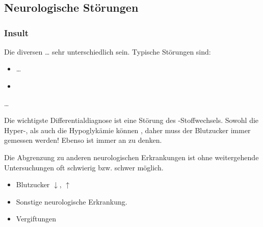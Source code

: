 \documentclass[
ngerman,
paper=a4,
asymmetric,
fontsize=10pt,
headings=small,
draft=false,
openany,
numbers=noenddot,
bibtotocnumbered,
footnotes=multiple,
toc=flat,
]{scrreprt}
\begin{document}
\chapter{{\AASS} \VarAassVersion}

\section{\CC{[NEU]} Neurologische Störungen}

\subsection{Insult}

\TextSlide{\TxSymptome}
{%
\label{topic:hirndruckzeichen}
Die diversen  {\ldots} 
sehr unterschiedlich
sein.  Typische Störungen sind:

\begin{itemize}
  \item \ldots
  \item {} 
\end{itemize}
}
{
\ldots
}{}{}{}

{
Die wichtigste Differentialdiagnose ist eine Störung des
-Stoffwechsels. Sowohl die Hyper-, als auch
die Hypoglykämie können , daher
muss der Blutzucker immer gemessen werden!
Ebenso ist immer
an  zu denken.

Die Abgrenzung zu anderen neurologischen Erkrankungen ist
ohne weitergehende Untersuchungen oft schwierig bzw. schwer
möglich. 
}{
\begin{itemize}
  \item Blutzucker ${\downarrow}$, ${\uparrow}$
  \item Sonstige neurologische Erkrankung.
  \item Vergiftungen
\end{itemize}

}{}{}{}


% 
% 
% 


\printbibliography

\end{document}
